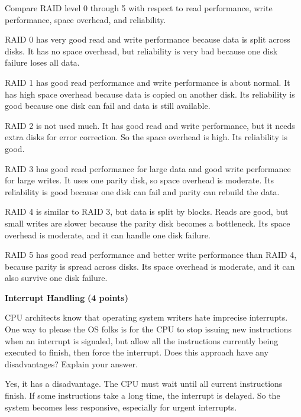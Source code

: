 \documentclass[10pt,answers]{exam}
\newcommand{\qpoints}[1]{\hfill \textbf{(#1 points)}}
\begin{document}
\begin{questions}
Compare RAID level 0 through 5 with respect to read performance, write performance, space overhead, and reliability.

\begin{solution}
RAID 0 has very good read and write performance because data is split across disks.
It has no space overhead, but reliability is very bad because one disk failure loses all data.

RAID 1 has good read performance and write performance is about normal.
It has high space overhead because data is copied on another disk.
Its reliability is good because one disk can fail and data is still available.

RAID 2 is not used much.
It has good read and write performance, but it needs extra disks for error correction.
So the space overhead is high.
Its reliability is good.

RAID 3 has good read performance for large data and good write performance for large writes.
It uses one parity disk, so space overhead is moderate.
Its reliability is good because one disk can fail and parity can rebuild the data.

RAID 4 is similar to RAID 3, but data is split by blocks.
Reads are good, but small writes are slower because the parity disk becomes a bottleneck.
Its space overhead is moderate, and it can handle one disk failure.

RAID 5 has good read performance and better write performance than RAID 4, because parity is spread across disks.
Its space overhead is moderate, and it can also survive one disk failure.
\end{solution}


\question \textbf{Interrupt Handling} \qpoints{4}

CPU architects know that operating system writers hate imprecise interrupts. One way to please the OS folks is for the CPU to stop issuing new instructions when an interrupt is signaled, but allow all the instructions currently being executed to finish, then force the interrupt. Does this approach have any disadvantages? Explain your answer.

\begin{solution}
Yes, it has a disadvantage.
The CPU must wait until all current instructions finish.
If some instructions take a long time, the interrupt is delayed.
So the system becomes less responsive, especially for urgent interrupts.
\end{solution}



\end{questions}
\end{document}

